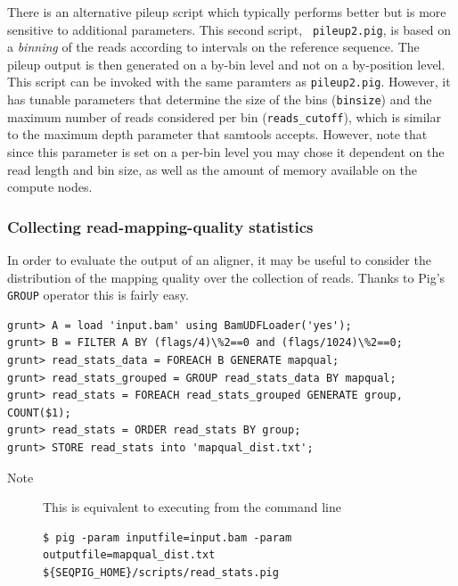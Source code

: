 There is an alternative pileup script which typically performs better but
is more sensitive to additional parameters. This second script, {\tt
pileup2.pig}, is based on a \emph{binning} of the reads according to
intervals on the reference sequence. The pileup output is then generated on
a by-bin level and not on a by-position level. This script can be invoked
with the same paramters as {\tt pileup2.pig}. However, it has tunable
parameters that determine the size of the bins ({\tt binsize}) and the
maximum number of reads considered per bin ({\tt reads\_cutoff}), which is
similar to the maximum depth parameter that samtools accepts. However,
note that since this parameter is set on a per-bin level you may chose it dependent on
the read length and bin size, as well as the amount of memory available on
the compute nodes.


\subsubsection{Collecting read-mapping-quality statistics}
In order to evaluate the output of an aligner, it may be useful to
consider the distribution of the mapping quality over the collection of
reads. Thanks to Pig's {\tt GROUP} operator this is fairly easy.
\begin{lstlisting}
grunt> A = load 'input.bam' using BamUDFLoader('yes');
grunt> B = FILTER A BY (flags/4)\%2==0 and (flags/1024)\%2==0;
grunt> read_stats_data = FOREACH B GENERATE mapqual;
grunt> read_stats_grouped = GROUP read_stats_data BY mapqual;
grunt> read_stats = FOREACH read_stats_grouped GENERATE group, COUNT($1);
grunt> read_stats = ORDER read_stats BY group;
grunt> STORE read_stats into 'mapqual_dist.txt';
\end{lstlisting}
\begin{description}
	\item[Note] This is equivalent to executing from the command line
\begin{lstlisting}
$ pig -param inputfile=input.bam -param outputfile=mapqual_dist.txt ${SEQPIG_HOME}/scripts/read_stats.pig
\end{lstlisting}
\end{description}

